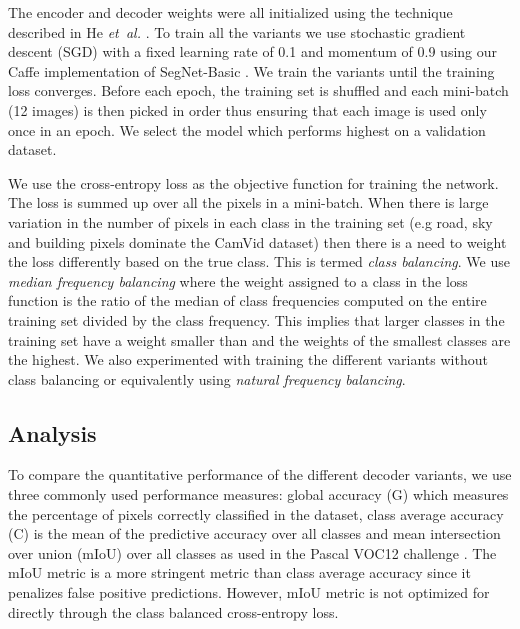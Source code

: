 \documentclass[10pt,journal,compsoc]{IEEEtran}
\begin{document}
The encoder and decoder weights were all initialized using the technique described in He \emph{et~al.} \cite{he2015delvingICCV}. To train all the variants we use stochastic gradient descent (SGD) with a fixed learning rate of 0.1 and momentum of 0.9 \cite{Bottou} using our Caffe implementation of SegNet-Basic \cite{jia2014caffeACM}. We train the variants until the training loss converges. Before each epoch, the training set is shuffled and each mini-batch (12 images) is then picked in order thus ensuring that each image is used only once in an epoch. We select the model which performs highest on a validation dataset.

We use the cross-entropy loss \cite{FCN} as the objective function for training the network. The loss is summed up over all the pixels in a mini-batch. When there is large variation in the number of pixels in each class in the training set (e.g road, sky and building pixels dominate the CamVid dataset) then there is a need to weight the loss differently based on the true class. This is termed \textit{class balancing}. We use \textit{median frequency balancing } \cite{eigen2015predicting} where the weight assigned to a class in the loss function is the ratio of the median of class frequencies computed on the entire training set divided by the class frequency. This implies that larger classes in the training set have a weight smaller than  and the weights of the smallest classes are the highest. We also experimented with training the different variants without class balancing or equivalently using \textit{natural frequency balancing}.

\subsection{Analysis}
\label{Analysis}
To compare the quantitative performance of the different decoder variants, we use three commonly used performance measures: global accuracy (G) which measures the percentage of pixels correctly classified in the dataset, class average accuracy (C) is the mean of the predictive accuracy over all classes and mean intersection over union (mIoU) over all classes as used in the Pascal VOC12 challenge \cite{Pascal}. The mIoU metric is a more stringent metric than class average accuracy since it penalizes false positive predictions. However, mIoU metric is not optimized for directly through the class balanced cross-entropy loss. 
\end{document}
